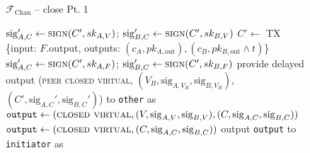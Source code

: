 \begin{figure}[H]
\begin{systembox}{$\mathcal{F}_{\mathrm{Chan}}$ -- close Pt. 1}
\begin{algorithmic}[1]
              \State $\mathrm{sig}_{A, C}' \gets \textsc{sign}(C', sk_{A, V})$;
              $\mathrm{sig}_{B, C}' \gets \textsc{sign}(C', sk_{B, V})$
            \Else \: 
              \State $C' \gets$ TX \{input: $F$.output, outputs: $(c_A, pk_{A,
              \mathrm{out}}), (c_B, pk_{B, \mathrm{out}} \wedge t)$\}
              \State $\mathrm{sig}_{A, C}' \gets \textsc{sign}(C', sk_{A, F})$;
              $\mathrm{sig}_{B, C}' \gets \textsc{sign}(C', sk_{B, F})$
            \EndIf
            \State provide delayed output (\textsc{peer closed virtual}, $(V_B,
            \mathrm{sig}_{A, V_B}, \mathrm{sig}_{B, V_B})$, $(C',
            \mathrm{sig}_{A, C}', \mathrm{sig}_{B, C}')$) to \texttt{other} as
            \bob
          \EndIf
            \State $\mathtt{output} \gets (\textsc{closed virtual}, (V,
            \mathrm{sig}_{A, V}, \mathrm{sig}_{B, V}), (C, \mathrm{sig}_{A, C},
            \mathrm{sig}_{B, C}))$
          \Else
            \State $\mathtt{output} \gets (\textsc{closed virtual}, (C,
            \mathrm{sig}_{A, C}, \mathrm{sig}_{B, C}))$
          \EndIf
          \State output \texttt{output} to \texttt{initiator} as \alice
        \EndIf
      \EndIndent
    \end{algorithmic}
  \end{systembox}
  \caption{}
  \label{code:functionality:chan:skeleton:close:pt1}
\end{figure}

